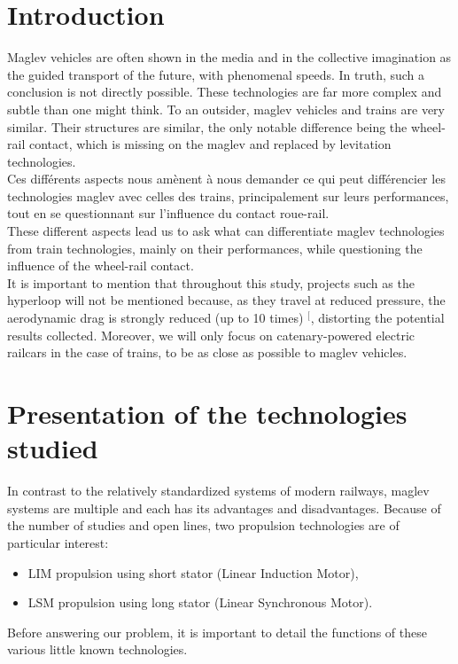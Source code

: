\documentclass[12pt, a4paper, onecolumn]{article}
\makeatletter
\renewcommand{\tab}{\tabto{15px}}
\newcommand{\csvdel}{}
\newcommand{\bettercite}[1][,]{%
  \renewcommand{\csvdel}{\renewcommand{\csvdel}{}}%
  \csname\endcsname$^[$\checknextarg}
\newcommand{\checknextarg}{\@ifnextchar\bgroup{\gobblenext}{}}%
\newcommand{\gobblenext}[1]{\csvdel\textcolor{blue}{\textbf{\cite{#1}}}\@ifnextchar\bgroup{$^,$\gobblenext}{$^]$}}%
\makeatother
\begin{document}
\section*{Introduction} %
\tab Maglev vehicles are often shown in the media and in the collective imagination as the guided transport of the future, with phenomenal speeds.
In truth, such a conclusion is not directly possible.
These technologies are far more complex and subtle than one might think.
To an outsider, maglev vehicles and trains are very similar.
Their structures are similar, the only notable difference being the wheel-rail contact, which is missing on the maglev and replaced by levitation technologies. \\
\linebreak
\tab Ces différents aspects nous amènent à nous demander ce qui peut différencier les technologies maglev avec celles des trains, principalement sur leurs performances, tout en se questionnant sur l’influence du contact roue-rail. \\
\tab These different aspects lead us to ask what can differentiate maglev technologies from train technologies, mainly on their performances, while questioning the influence of the wheel-rail contact. \\
\linebreak
\tab It is important to mention that throughout this study, projects such as the hyperloop will not be mentioned because, as they travel at reduced pressure, the aerodynamic drag is strongly reduced (up to 10 times)\bettercite{maglevintube}, distorting the potential results collected.
Moreover, we will only focus on catenary-powered electric railcars in the case of trains, to be as close as possible to maglev vehicles. \\



\pagebreak %
\section{Presentation of the technologies studied} %
\tab In contrast to the relatively standardized systems of modern railways, maglev systems are multiple and each has its advantages and disadvantages.
Because of the number of studies and open lines, two propulsion technologies are of particular interest:
\begin{itemize}
  \item LIM propulsion using short stator (Linear Induction Motor),
  \item LSM propulsion using long stator (Linear Synchronous Motor).
\end{itemize}
\tab Before answering our problem, it is important to detail the functions of these various little known technologies.
\end{document}
